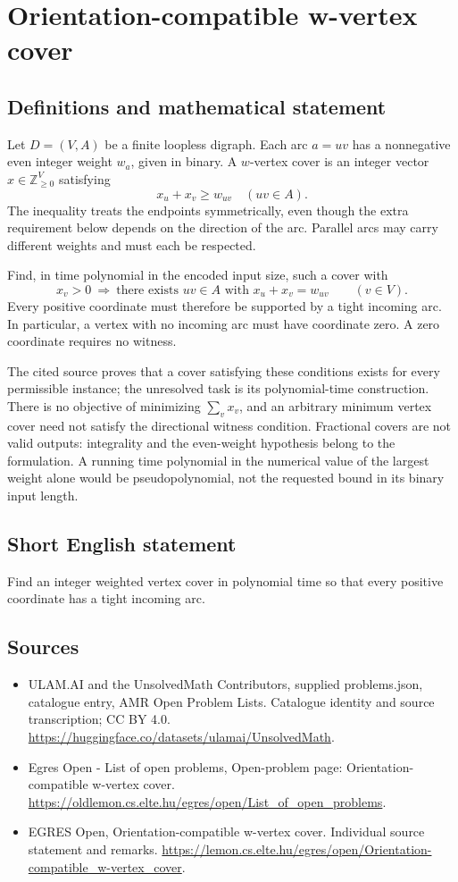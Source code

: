 \documentclass[11pt,a4paper]{article}
\begin{document}
\section*{Orientation-compatible w-vertex cover}\label{statement}

\subsection{Definitions and mathematical statement}
Let $D=(V,A)$ be a finite loopless digraph. Each arc $a=uv$ has a
nonnegative even integer weight $w_a$, given in binary. A $w$-vertex
cover is an integer vector $x\in\mathbb Z_{\ge0}^V$ satisfying
\[
                         x_u+x_v\ge w_{uv}\quad(uv\in A).
\]
The inequality treats the endpoints symmetrically, even though the
extra requirement below depends on the direction of the arc. Parallel
arcs may carry different weights and must each be respected.

Find, in time polynomial in the encoded input size, such a cover with
\[
 x_v>0\ \Longrightarrow\
       \text{there exists }uv\in A\text{ with }x_u+x_v=w_{uv}
                     \qquad(v\in V).
\]
Every positive coordinate must therefore be supported by a tight
incoming arc. In particular, a vertex with no incoming arc must have
coordinate zero. A zero coordinate requires no witness.

The cited source proves that a cover satisfying these conditions
exists for every permissible instance; the unresolved task is its
polynomial-time construction. There is no objective of minimizing
$\sum_v x_v$, and an arbitrary minimum vertex cover need not satisfy
the directional witness condition. Fractional covers are not valid
outputs: integrality and the even-weight hypothesis belong to the
formulation. A running time polynomial in the numerical value of the
largest weight alone would be pseudopolynomial, not the requested
bound in its binary input length.
\subsection{Short English statement}
Find an integer weighted vertex cover in polynomial time so that every positive coordinate has a tight incoming arc.
\subsection{Sources}
\begin{itemize}
\item[S1] ULAM.AI and the UnsolvedMath Contributors, supplied problems.json, catalogue entry, AMR Open Problem Lists. Catalogue identity and source transcription; CC BY 4.0.
\url{https://huggingface.co/datasets/ulamai/UnsolvedMath}.
\item[S2] Egres Open - List of open problems, Open-problem page: Orientation-compatible w-vertex cover. 
\url{https://oldlemon.cs.elte.hu/egres/open/List_of_open_problems}.
\item[S3] EGRES Open, Orientation-compatible w-vertex cover. Individual source statement and remarks.
\url{https://lemon.cs.elte.hu/egres/open/Orientation-compatible_w-vertex_cover}.
\end{itemize}
\end{document}
